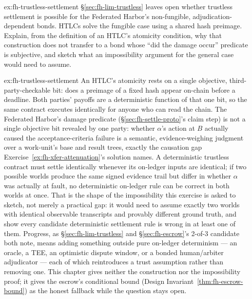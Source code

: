 \documentclass[11pt,a4paper]{article}
\theoremstyle{definition}
\theoremstyle{remark}
\begin{document}
\begin{pdexercise}[kind=Open,rating=3]{ex:fh-trustless-settlement}
\S\ref{sec:fh-lim-trustless} leaves open whether trustless settlement is possible for the Federated Harbor's non-fungible, adjudication-dependent bonds. HTLCs solve the fungible case using a shared hash preimage. Explain, from the definition of an HTLC's atomicity condition, why that construction does not transfer to a bond whose ``did the damage occur'' predicate is subjective, and sketch what an impossibility argument for the general case would need to assume.
\end{pdexercise}
\begin{pdsolution}{ex:fh-trustless-settlement}
An HTLC's atomicity rests on a single objective, third-party-checkable bit: does a preimage of a fixed hash appear on-chain before a deadline. Both parties' payoffs are a deterministic function of that one bit, so the same contract executes identically for anyone who can read the chain. The Federated Harbor's damage predicate (\S\ref{sec:fh-settle-proto}'s claim step) is not a single objective bit revealed by one party: whether $\alpha$'s action at $B$ actually caused the acceptance-criteria failure is a semantic, evidence-weighing judgment over a work-unit's base and result trees, exactly the causation gap Exercise~\ref{ex:fh-xfer-attenuation}'s solution names. A deterministic trustless contract must settle identically whenever its on-ledger inputs are identical; if two possible worlds produce the same signed evidence trail but differ in whether $\alpha$ was actually at fault, no deterministic on-ledger rule can be correct in both worlds at once. That is the shape of the impossibility this exercise is asked to sketch, not merely a practical gap: it would need to assume exactly two worlds with identical observable transcripts and provably different ground truth, and show every candidate deterministic settlement rule is wrong in at least one of them. Progress, as \S\ref{sec:fh-lim-trustless} and \S\ref{sec:fh-escrow}'s 2-of-3 candidate both note, means adding something outside pure on-ledger determinism --- an oracle, a TEE, an optimistic dispute window, or a bonded human/arbiter adjudicator --- each of which reintroduces a trust assumption rather than removing one. This chapter gives neither the construction nor the impossibility proof; it gives the escrow's conditional bound (Design Invariant~\ref{thm:fh-escrow-bound}) as the honest fallback while the question stays open.
\end{pdsolution}
\end{document}
